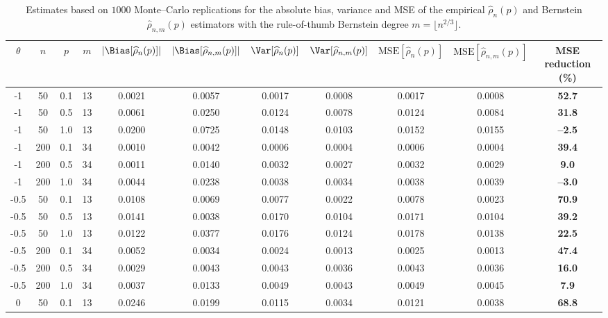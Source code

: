 \begin{table}[ht!]
\centering
\caption{Estimates based on $1000$ Monte--Carlo replications for the absolute bias, variance and MSE of the empirical $\widehat{\rho}_n(p)$ and Bernstein $\widehat{\rho}_{n,m}(p)$ estimators with the rule-of-thumb Bernstein degree $m = \lfloor n^{2/3} \rfloor$.}
\vspace{4mm}
\label{tab:1}
\setlength{\tabcolsep}{5pt}
\small
\begin{tabular}{ccccccccccc}
\hline
$\theta$ & $n$ & $p$ & $m$ & $\lvert\Bias[\widehat{\rho}_n(p)]\rvert$ & $\lvert\Bias[\widehat{\rho}_{n,m}(p)]\rvert$ & $\Var[\widehat{\rho}_n(p)]$ & $\Var[\widehat{\rho}_{n,m}(p)]$ & $\mathrm{MSE}[\widehat{\rho}_n(p)]$ & $\mathrm{MSE}[\widehat{\rho}_{n,m}(p)]$ & MSE reduction (\%) \\
\hline
-1 & 50 & 0.1 & 13 & 0.0021 & 0.0057 & 0.0017 & 0.0008 & 0.0017 & 0.0008 & \textbf{52.7} \\
-1 & 50 & 0.5 & 13 & 0.0061 & 0.0250 & 0.0124 & 0.0078 & 0.0124 & 0.0084 & \textbf{31.8} \\
-1 & 50 & 1.0 & 13 & 0.0200 & 0.0725 & 0.0148 & 0.0103 & 0.0152 & 0.0155 & \textbf{--2.5} \\
\hline
-1 & 200 & 0.1 & 34 & 0.0010 & 0.0042 & 0.0006 & 0.0004 & 0.0006 & 0.0004 & \textbf{39.4} \\
-1 & 200 & 0.5 & 34 & 0.0011 & 0.0140 & 0.0032 & 0.0027 & 0.0032 & 0.0029 & \textbf{9.0} \\
-1 & 200 & 1.0 & 34 & 0.0044 & 0.0238 & 0.0038 & 0.0034 & 0.0038 & 0.0039 & \textbf{--3.0} \\
\hline\hline
-0.5 & 50 & 0.1 & 13 & 0.0108 & 0.0069 & 0.0077 & 0.0022 & 0.0078 & 0.0023 & \textbf{70.9} \\
-0.5 & 50 & 0.5 & 13 & 0.0141 & 0.0038 & 0.0170 & 0.0104 & 0.0171 & 0.0104 & \textbf{39.2} \\
-0.5 & 50 & 1.0 & 13 & 0.0122 & 0.0377 & 0.0176 & 0.0124 & 0.0178 & 0.0138 & \textbf{22.5} \\
\hline
-0.5 & 200 & 0.1 & 34 & 0.0052 & 0.0034 & 0.0024 & 0.0013 & 0.0025 & 0.0013 & \textbf{47.4} \\
-0.5 & 200 & 0.5 & 34 & 0.0029 & 0.0043 & 0.0043 & 0.0036 & 0.0043 & 0.0036 & \textbf{16.0} \\
-0.5 & 200 & 1.0 & 34 & 0.0037 & 0.0133 & 0.0049 & 0.0043 & 0.0049 & 0.0045 & \textbf{7.9} \\
\hline\hline
0 & 50 & 0.1 & 13 & 0.0246 & 0.0199 & 0.0115 & 0.0034 & 0.0121 & 0.0038 & \textbf{68.8} \\

\end{tabular}
\end{table}
